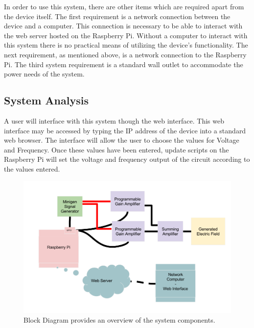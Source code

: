 \documentclass{article}	%
\begin{document}
\begin{multicols}{2}
In order to use this system,
there are other items which are required
apart from the device itself. 
The first requirement is a network connection between the device and a computer.
This connection is necessary to be able to interact with the web server hosted on the Raspberry Pi. 
Without a computer to interact with this system there is no practical means of utilizing the device's functionality. 
The next requirement, as mentioned above, is a network connection to the Raspberry Pi. 
The third system requirement is a standard wall outlet
to accommodate the power needs of the system. 

\subsection{System Analysis}
A user will interface with this system though the web interface.
This web interface may be accessed by
typing the IP address of the device into a standard web browser.
The interface will allow the user to choose the values for Voltage and Frequency.
Once these values have been entered,
update scripts on the Raspberry Pi
will set the voltage and frequency output of the circuit
according to the values entered.

\begin{figure}[!hbt]
\begin{center}
\includegraphics[width=1.0\textwidth,keepaspectratio]{block_diagram.png}
\end{center}
\caption{Block Diagram provides an overview of the system components.}
\end{figure}


\end{multicols}
\end{document}

